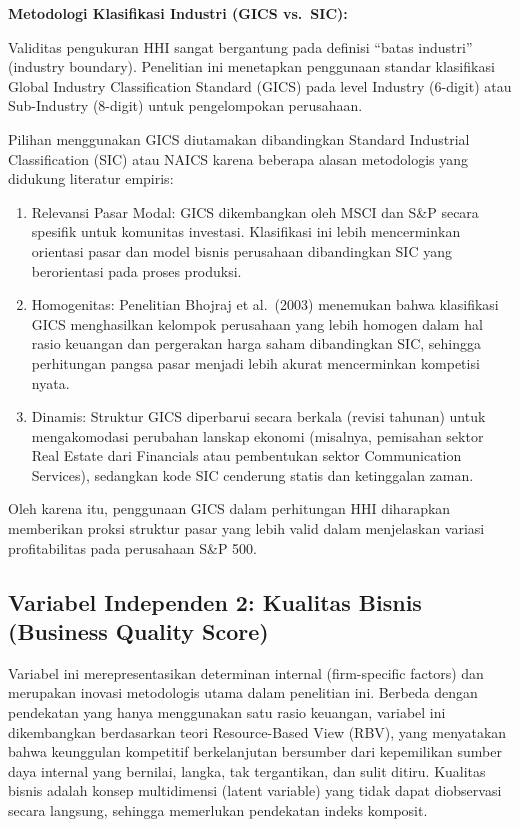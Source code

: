 \documentclass[12pt,a4paper]{report}
\providecommand{\tightlist}{%
  \setlength{\itemsep}{0pt}\setlength{\parskip}{0pt}%
}
\begin{document}
\textbf{Metodologi Klasifikasi Industri (GICS vs.~SIC):}

Validitas pengukuran HHI sangat bergantung pada definisi ``batas
industri'' (industry boundary). Penelitian ini menetapkan penggunaan
standar klasifikasi Global Industry Classification Standard (GICS) pada
level Industry (6-digit) atau Sub-Industry (8-digit) untuk pengelompokan
perusahaan.

Pilihan menggunakan GICS diutamakan dibandingkan Standard Industrial
Classification (SIC) atau NAICS karena beberapa alasan metodologis yang
didukung literatur empiris:

\begin{enumerate}
\def\labelenumi{\arabic{enumi}.}
\tightlist
\item
  Relevansi Pasar Modal: GICS dikembangkan oleh MSCI dan S\&P secara
  spesifik untuk komunitas investasi. Klasifikasi ini lebih mencerminkan
  orientasi pasar dan model bisnis perusahaan dibandingkan SIC yang
  berorientasi pada proses produksi.
\item
  Homogenitas: Penelitian Bhojraj et al.~(2003) menemukan bahwa
  klasifikasi GICS menghasilkan kelompok perusahaan yang lebih homogen
  dalam hal rasio keuangan dan pergerakan harga saham dibandingkan SIC,
  sehingga perhitungan pangsa pasar menjadi lebih akurat mencerminkan
  kompetisi nyata.
\item
  Dinamis: Struktur GICS diperbarui secara berkala (revisi tahunan)
  untuk mengakomodasi perubahan lanskap ekonomi (misalnya, pemisahan
  sektor Real Estate dari Financials atau pembentukan sektor
  Communication Services), sedangkan kode SIC cenderung statis dan
  ketinggalan zaman.
\end{enumerate}

Oleh karena itu, penggunaan GICS dalam perhitungan HHI diharapkan
memberikan proksi struktur pasar yang lebih valid dalam menjelaskan
variasi profitabilitas pada perusahaan S\&P 500.

\hypertarget{variabel-independen-2-kualitas-bisnis-business-quality-score}{%
\subsection{Variabel Independen 2: Kualitas Bisnis (Business Quality
Score)}\label{variabel-independen-2-kualitas-bisnis-business-quality-score}}

Variabel ini merepresentasikan determinan internal (firm-specific
factors) dan merupakan inovasi metodologis utama dalam penelitian ini.
Berbeda dengan pendekatan yang hanya menggunakan satu rasio keuangan,
variabel ini dikembangkan berdasarkan teori Resource-Based View (RBV),
yang menyatakan bahwa keunggulan kompetitif berkelanjutan bersumber dari
kepemilikan sumber daya internal yang bernilai, langka, tak tergantikan,
dan sulit ditiru. Kualitas bisnis adalah konsep multidimensi (latent
variable) yang tidak dapat diobservasi secara langsung, sehingga
memerlukan pendekatan indeks komposit.
\end{document}
